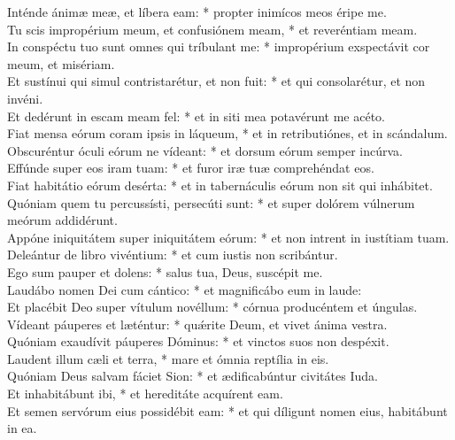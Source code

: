 {	Inténde ánimæ meæ, et líbera eam: * propter inimícos meos éripe me. \\
	Tu scis impropérium meum, et confusiónem meam, * et reveréntiam meam. \\
	In conspéctu tuo sunt omnes qui tríbulant me: * impropérium exspectávit cor meum, et misériam. \\
	Et sustínui qui simul contristarétur, et non fuit: * et qui consolarétur, et non invéni. \\
	Et dedérunt in escam meam fel: * et in siti mea potavérunt me acéto. \\
	Fiat mensa eórum coram ipsis in láqueum, * et in retributiónes, et in scándalum. \\
	Obscuréntur óculi eórum ne vídeant: * et dorsum eórum semper incúrva. \\
	Effúnde super eos iram tuam: * et furor iræ tuæ comprehéndat eos. \\
	Fiat habitátio eórum desérta: * et in tabernáculis eórum non sit qui inhábitet. \\
	Quóniam quem tu percussísti, persecúti sunt: * et super dolórem vúlnerum meórum addidérunt. \\
	Appóne iniquitátem super iniquitátem eórum: * et non intrent in iustítiam tuam. \\
	Deleántur de libro vivéntium: * et cum iustis non scribántur. \\
	Ego sum pauper et dolens: * salus tua, Deus, suscépit me. \\
	Laudábo nomen Dei cum cántico: * et magnificábo eum in laude: \\
	Et placébit Deo super vítulum novéllum: * córnua producéntem et úngulas. \\
	Vídeant páuperes et læténtur: * quǽrite Deum, et vivet ánima vestra. \\
	Quóniam exaudívit páuperes Dóminus: * et vinctos suos non despéxit. \\
	Laudent illum cæli et terra, * mare et ómnia reptília in eis. \\
	Quóniam Deus salvam fáciet Sion: * et ædificabúntur civitátes Iuda. \\
	Et inhabitábunt ibi, * et hereditáte acquírent eam. \\
	Et semen servórum eius possidébit eam: * et qui díligunt nomen eius, habitábunt in ea. \\
}

